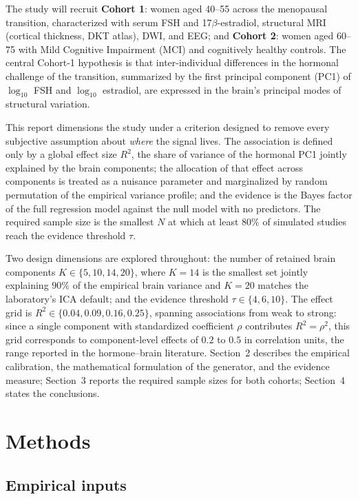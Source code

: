 \documentclass[11pt,a4paper]{article}
\begin{document}
The study will recruit \textbf{Cohort 1}: women aged 40--55 across the menopausal transition, characterized with serum FSH and 17$\beta$-estradiol, structural MRI (cortical thickness, DKT atlas), DWI, and EEG; and \textbf{Cohort 2}: women aged 60--75 with Mild Cognitive Impairment (MCI) and cognitively healthy controls. The central Cohort-1 hypothesis is that inter-individual differences in the hormonal challenge of the transition, summarized by the first principal component (PC1) of $\log_{10}$ FSH and $\log_{10}$ estradiol, are expressed in the brain's principal modes of structural variation.

This report dimensions the study under a criterion designed to remove every subjective assumption about \emph{where} the signal lives. The association is defined only by a global effect size $R^{2}$, the share of variance of the hormonal PC1 jointly explained by the brain components; the allocation of that effect across components is treated as a nuisance parameter and marginalized by random permutation of the empirical variance profile; and the evidence is the Bayes factor of the full regression model against the null model with no predictors. The required sample size is the smallest $N$ at which at least $80\%$ of simulated studies reach the evidence threshold $\tau$.

Two design dimensions are explored throughout: the number of retained brain components $K\in\{5,10,14,20\}$, where $K=14$ is the smallest set jointly explaining $90\%$ of the empirical brain variance and $K=20$ matches the laboratory's ICA default; and the evidence threshold $\tau\in\{4,6,10\}$. The effect grid is $R^{2}\in\{0.04,0.09,0.16,0.25\}$, spanning associations from weak to strong: since a single component with standardized coefficient $\rho$ contributes $R^{2}=\rho^{2}$, this grid corresponds to component-level effects of $0.2$ to $0.5$ in correlation units, the range reported in the hormone--brain literature. Section~2 describes the empirical calibration, the mathematical formulation of the generator, and the evidence measure; Section~3 reports the required sample sizes for both cohorts; Section~4 states the conclusions.

\section{Methods}

\subsection{Empirical inputs}
\end{document}
